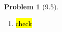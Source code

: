 \documentclass[twoside,11pt]{article}
\theoremstyle{definition}
\newtheorem{problem}{Problem}
\theoremstyle{remark}
\begin{document}
\begin{problem}[9.5]
\begin{enumerate}[label=(\alph*)]
\item \hl{check}



\end{enumerate}
\end{problem}
\end{document}
